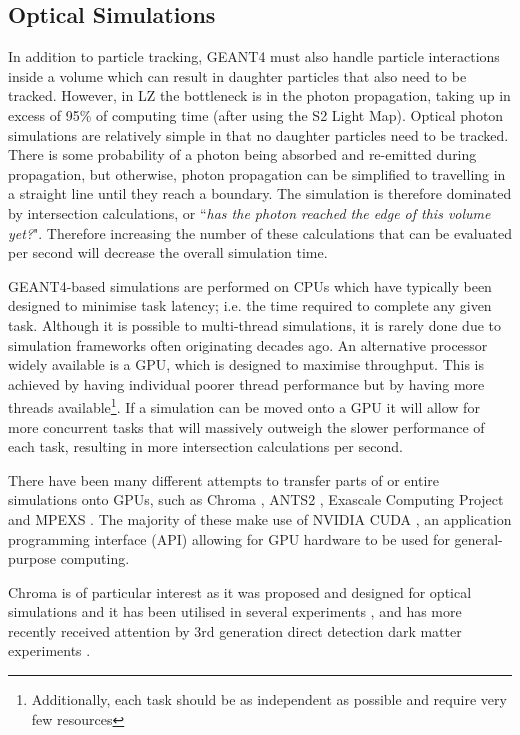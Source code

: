 \subsection{Optical Simulations}
\par
In addition to particle tracking, GEANT4 must also handle particle interactions inside a volume which can result in daughter particles that also need to be tracked.
However, in LZ the bottleneck is in the photon propagation, taking up in excess of 95\% of computing time (after using the S2 Light Map).
Optical photon simulations are relatively simple in that no daughter particles need to be tracked.
There is some probability of a photon being absorbed and re-emitted during propagation, but otherwise, photon propagation can be simplified to travelling in a straight line until they reach a boundary.
The simulation is therefore dominated by intersection calculations, or ``\textit{has the photon reached the edge of this volume yet?}".
Therefore increasing the number of these calculations that can be evaluated per second will decrease the overall simulation time.
\par
GEANT4-based simulations are performed on CPUs which have typically been designed to minimise task latency; i.e. the time required to complete any given task.
Although it is possible to multi-thread simulations, it is rarely done due to simulation frameworks often originating decades ago.
An alternative processor widely available is a GPU, which is designed to maximise throughput.
This is achieved by having individual poorer thread performance but by having more threads available\footnote{Additionally, each task should be as independent as possible and require very few resources}.
If a simulation can be moved onto a GPU it will allow for more concurrent tasks that will massively outweigh the slower performance of each task, resulting in more intersection calculations per second.
\par
There have been many different attempts to transfer parts of or entire simulations onto GPUs, such as Chroma \cite{chroma_whitepaper_ref}, ANTS2 \cite{ants2_whitepaper_ref}, Exascale Computing Project \cite{ExaSMR_whitepaper_ref} and MPEXS \cite{mpexs_whitepaper_ref}.
The majority of these make use of NVIDIA CUDA \cite{cuda_ref}, an application programming interface (API) allowing for GPU hardware to be used for general-purpose computing.
\par
Chroma is of particular interest as it was proposed and designed for optical simulations and it has been utilised in several experiments \cite{chroma_with_tpcs1_ref,chroma_with_tpcs2_ref,chroma_with_tpcs3_ref}, and has more recently received attention by 3rd generation direct detection dark matter experiments \cite{DARWIN_GPU_simulations_2022_ref}.
